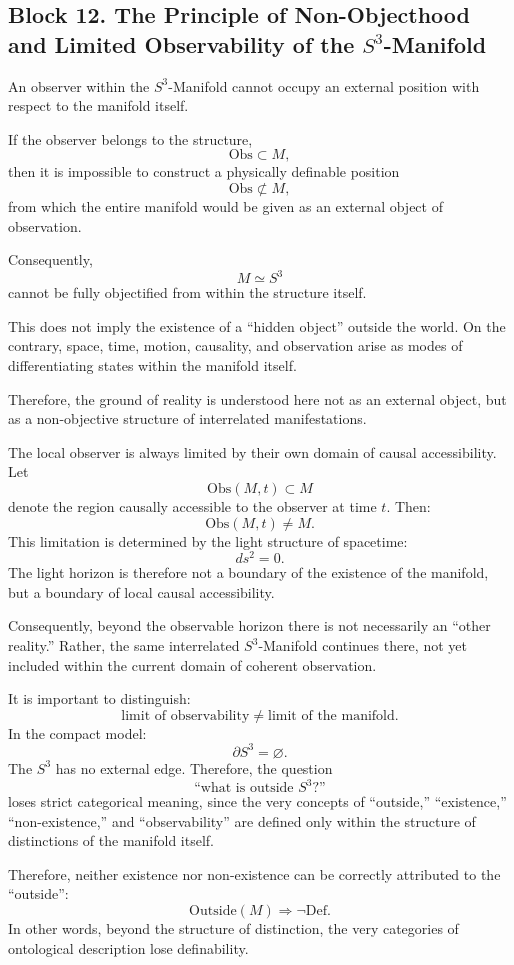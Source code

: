 \documentclass[12pt,a4paper]{article}
\theoremstyle{definition}
\begin{document}
\subsection{Block 12. The Principle of Non-Objecthood and Limited Observability of the \(S^3\)-Manifold}
An observer within the \(S^3\)-Manifold cannot occupy an external position with respect to the manifold itself.

If the observer belongs to the structure,
\[
\mathrm{Obs}\subset M,
\]
then it is impossible to construct a physically definable position
\[
\mathrm{Obs}\not\subset M,
\]
from which the entire manifold would be given as an external object of observation.

Consequently,
\[
M\simeq S^3
\]
cannot be fully objectified from within the structure itself.

This does not imply the existence of a ``hidden object'' outside the world. On the contrary, space, time, motion, causality, and observation arise as modes of differentiating states within the manifold itself.

Therefore, the ground of reality is understood here not as an external object, but as a non-objective structure of interrelated manifestations.

The local observer is always limited by their own domain of causal accessibility. Let
\[
\mathrm{Obs}(M,t)\subset M
\]
denote the region causally accessible to the observer at time \(t\). Then:
\[
\mathrm{Obs}(M,t)\neq M.
\]
This limitation is determined by the light structure of spacetime:
\[
ds^2=0.
\]
The light horizon is therefore not a boundary of the existence of the manifold, but a boundary of local causal accessibility.

Consequently, beyond the observable horizon there is not necessarily an ``other reality.'' Rather, the same interrelated \(S^3\)-Manifold continues there, not yet included within the current domain of coherent observation.

It is important to distinguish:
\[
\text{limit of observability}
\neq
\text{limit of the manifold}.
\]
In the compact model:
\[
\partial S^3=\varnothing.
\]
The \(S^3\) has no external edge. Therefore, the question
\[
\text{``what is outside } S^3\text{?''}
\]
loses strict categorical meaning, since the very concepts of ``outside,'' ``existence,'' ``non-existence,'' and ``observability'' are defined only within the structure of distinctions of the manifold itself.

Therefore, neither existence nor non-existence can be correctly attributed to the ``outside'':
\[
\mathrm{Outside}(M)\Rightarrow \neg\mathrm{Def}.
\]
In other words, beyond the structure of distinction, the very categories of ontological description lose definability.
\end{document}

